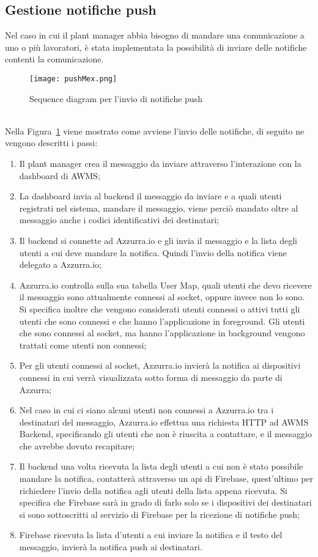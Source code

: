 \subsection{Gestione notifiche push}
Nel caso in cui il \gls{plant manager}\ap{[g]} abbia bisogno di mandare una comunicazione a uno o più lavoratori, è stata implementata la possibilità di inviare delle notifiche contenti la comunicazione.
\begin{figure}[h]
	\begin{center}
		\texttt{[image: pushMex.png]}
		\caption{Sequence diagram per l'invio di notifiche push}\label{fig:push}
	\end{center}
\end{figure}\\
Nella Figura~\ref{fig:push} viene mostrato come avviene l'invio delle notifiche, di seguito ne vengono descritti i passi:
\begin{enumerate}
	\item Il \gls{plant manager}\ap{[g]} crea il messaggio da inviare attraverso l'interazione con la dashboard di \gls{AWMS};
	\item La dashboard invia al backend il messaggio da inviare e a quali utenti registrati nel sistema, mandare il messaggio, viene perciò mandato oltre al messaggio anche i codici identificativi dei destinatari;
	\item Il backend si connette ad Azzurra.io e gli invia il messaggio e la lista degli utenti a cui deve mandare la notifica. Quindi l'invio della notifica viene delegato a Azzurra.io; 
	\item Azzurra.io controlla sulla sua tabella User Map, quali utenti che devo ricevere il messaggio sono attualmente connessi al socket, oppure invece non lo sono. Si specifica inoltre che vengono considerati utenti connessi o attivi tutti gli utenti che sono connessi e che hanno l’applicazione in foreground. Gli utenti che sono connessi al socket, ma hanno l’applicazione in background vengono trattati come utenti non connessi;
	\item Per gli utenti connessi al socket, Azzurra.io invierà la notifica ai dispositivi connessi in cui verrà visualizzata sotto forma di messaggio da parte di Azzurra;
	\item Nel caso in cui ci siano alcuni utenti non connessi a Azzurra.io tra i destinatari del messaggio, Azzurra.io effettua una richiesta HTTP ad AWMS Backend, specificando gli utenti che non è riuscita a contattare, e il messaggio che avrebbe dovuto recapitare;
	\item Il backend una volta ricevuta la lista degli utenti a cui non è stato possibile mandare la notifica, contatterà attraverso un \gls{api}\ap{[g]} di Firebase, quest'ultimo per richiedere l'invio della notifica agli utenti della lista appena ricevuta. Si specifica che Firebase sarà in grado di farlo solo se i dispositivi dei destinatari si sono sottoscritti al servizio di Firebase per la ricezione di notifiche push;
	\item Firebase ricevuta la lista d'utenti a cui inviare la notifica e il testo del messaggio, invierà la \gls{notifica push}\ap{[g]} ai destinatari.
\end{enumerate}
